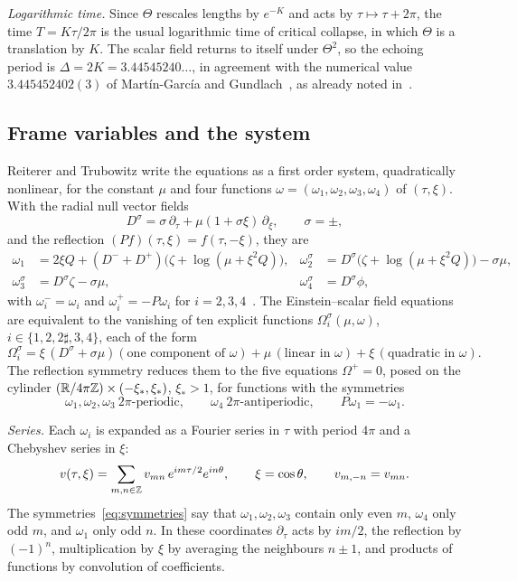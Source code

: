 \emph{Logarithmic time.} Since $\Theta$ rescales lengths by $e^{-K}$ and acts by $\tau\mapsto\tau+2\pi$,
the time $T=K\tau/2\pi$ is the usual logarithmic time of critical collapse, in which $\Theta$ is a
translation by $K$. The scalar field returns to itself under $\Theta^2$, so the echoing period is
$\Delta=2K=3.44545240\ldots$, in agreement with the numerical value $3.445452402(3)$ of
Mart\'in-Garc\'ia and Gundlach~\cite{MartinGarciaGundlach2003}, as already noted in~\cite{RT2019}.

\subsection{Frame variables and the system}\label{sec:setting-system}

Reiterer and Trubowitz write the equations as a first order system, quadratically nonlinear, for the
constant $\mu$ and four functions $\omega=(\omega_1,\omega_2,\omega_3,\omega_4)$ of $(\tau,\xi)$. With the
radial null vector fields
\[
  D^\sigma=\sigma\,\partial_\tau+\mu(1+\sigma\xi)\,\partial_\xi,\qquad\sigma=\pm,
\]
and the reflection $(Pf)(\tau,\xi)=f(\tau,-\xi)$, they are
\begin{equation}\label{eq:omega}
\begin{aligned}
  \omega_1&=2\xi Q+(D^-+D^+)\big(\zeta+\log(\mu+\xi^2Q)\big),&
  \omega_2^\sigma&=D^\sigma\big(\zeta+\log(\mu+\xi^2Q)\big)-\sigma\mu,\\
  \omega_3^\sigma&=D^\sigma\zeta-\sigma\mu,&
  \omega_4^\sigma&=D^\sigma\phi,
\end{aligned}
\end{equation}
with $\omega_i^-=\omega_i$ and $\omega_i^+=-P\omega_i$ for $i=2,3,4$~\cite[\S2]{RT2019}. The
Einstein--scalar field equations are equivalent to the vanishing of ten explicit functions
$\Omega_i^\sigma(\mu,\omega)$, $i\in\{1,2,2\sharp,3,4\}$, each of the form
\[
  \Omega_i^\sigma=\xi\,(D^\sigma+\sigma\mu)(\text{one component of }\omega)
  +\mu\,(\text{linear in }\omega)+\xi\,(\text{quadratic in }\omega).
\]
The reflection symmetry reduces them to the five equations $\Omega^+=0$, posed on the cylinder
$(\mathbb{R}/4\pi\mathbb{Z})\times(-\xi_*,\xi_*)$, $\xi_*>1$, for functions with the symmetries
\begin{equation}\label{eq:symmetries}
  \omega_1,\omega_2,\omega_3\ \text{$2\pi$-periodic},\qquad \omega_4\ \text{$2\pi$-antiperiodic},\qquad
  P\omega_1=-\omega_1.
\end{equation}

\emph{Series.} Each $\omega_i$ is expanded as a Fourier series in $\tau$ with period $4\pi$ and a
Chebyshev series in $\xi$:
\begin{equation}\label{eq:series}
  v(\tau,\xi)=\sum_{m,n\in\mathbb{Z}}v_{mn}\,e^{im\tau/2}e^{in\theta},\qquad \xi=\cos\theta,\qquad
  v_{m,-n}=v_{mn}.
\end{equation}
The symmetries~\eqref{eq:symmetries} say that $\omega_1,\omega_2,\omega_3$ contain only even $m$,
$\omega_4$ only odd $m$, and $\omega_1$ only odd $n$. In these coordinates $\partial_\tau$ acts by
$im/2$, the reflection by $(-1)^n$, multiplication by $\xi$ by averaging the neighbours $n\pm1$, and
products of functions by convolution of coefficients.

